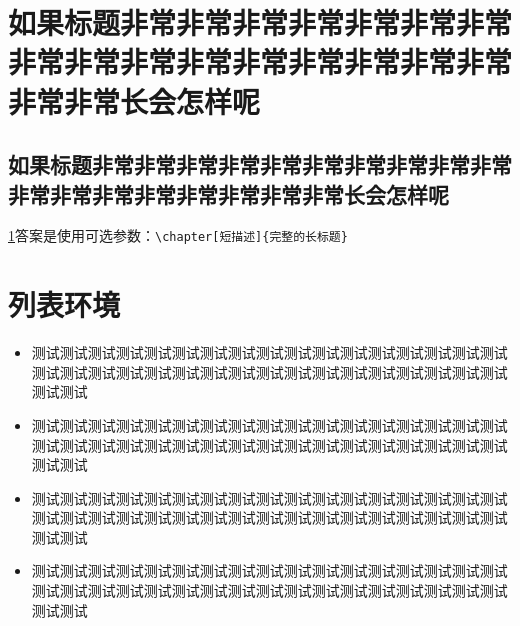 \documentclass[degree=phd,nlcover]{njuthesis}
\begin{document}
\maketitle




\raggedbottom

\tableofcontents
\listoffigures
\listoftables

\mainmatter

\chapter[非常长的标题不好看]{如果标题非常非常非常非常非常非常非常非常非常非常非常非常非常非常非常非常非常非常长会怎样呢}
\label{ch:longtitle}
\section[还是用短点的吧]{如果标题非常非常非常非常非常非常非常非常非常非常非常非常非常非常非常非常非常非常长会怎样呢}
\cref{ch:longtitle}答案是使用可选参数：\verb+\chapter[短描述]{完整的长标题}+

\zhlipsum[1-20][name=zhufu]

\chapter{列表环境}

\begin{itemize}
    \item 测试测试测试测试测试测试测试测试测试测试测试测试测试测试测试测试测试测试测试测试测试测试测试测试测试测试测试测试测试测试测试测试测试测试测试测试
    \item 测试测试测试测试测试测试测试测试测试测试测试测试测试测试测试测试测试测试测试测试测试测试测试测试测试测试测试测试测试测试测试测试测试测试测试测试
    \item 测试测试测试测试测试测试测试测试测试测试测试测试测试测试测试测试测试测试测试测试测试测试测试测试测试测试测试测试测试测试测试测试测试测试测试测试
    \item 测试测试测试测试测试测试测试测试测试测试测试测试测试测试测试测试测试测试测试测试测试测试测试测试测试测试测试测试测试测试测试测试测试测试测试测试
\end{itemize}
\end{document}
